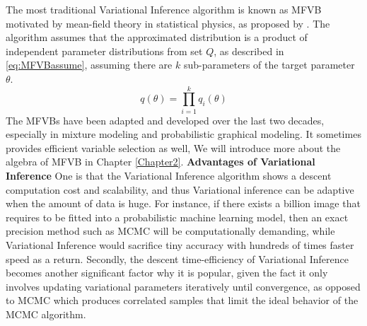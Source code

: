 The most traditional Variational Inference algorithm is known as MFVB motivated by mean-field theory in statistical physics, as proposed by 
\cite{parisi1988statistical}. The algorithm assumes that the approximated distribution is
a product of independent parameter distributions from set $Q$, as described in \autoref{eq:MFVBassume}, assuming there are $k$ sub-parameters of the target parameter $\theta$.
\begin{equation}
	\label{eq:MFVBassume}
	q(\theta) = \prod_{i=1}^{k} q_i(\theta)
\end{equation}
The MFVBs have been adapted and developed over the last two decades, especially in mixture modeling and probabilistic graphical modeling. It sometimes provides efficient variable selection as well, We will introduce more about the algebra of MFVB in Chapter \ref{Chapter2}. 
\textbf{Advantages of Variational Inference}
One is that the Variational Inference algorithm shows a descent computation cost and scalability, and thus Variational inference can be adaptive when the amount of data is huge. For instance, if there exists a billion image that requires to be fitted into a probabilistic machine learning model, then an exact precision method such as MCMC will be computationally demanding, while Variational Inference would sacrifice tiny accuracy with hundreds of times faster speed as a return.
Secondly, the descent time-efficiency of Variational Inference becomes another significant factor why it is popular, given the fact it only involves updating variational parameters iteratively until convergence, as opposed to MCMC which produces correlated samples that limit the ideal behavior of the MCMC algorithm.

